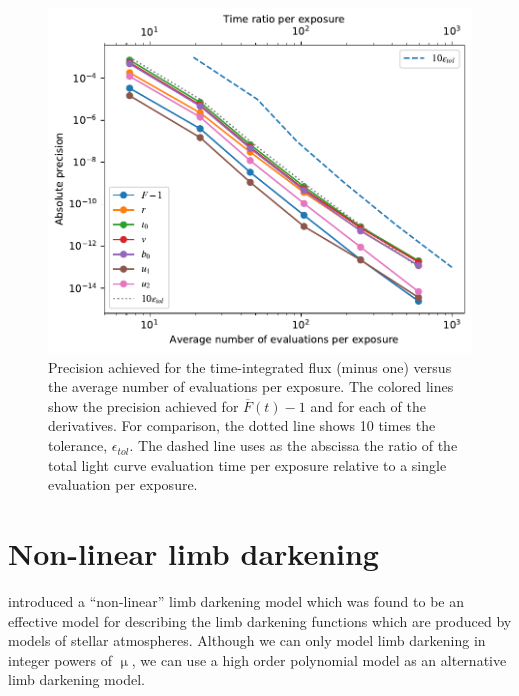 \documentclass[modern,trackchanges]{aastex63}
\begin{document}
{\begin{figure}
    \begin{centering}
    \includegraphics[width=\linewidth]{figures/julia/compare_precision.pdf}
    \caption{Precision achieved for the time-integrated flux (minus one)
    versus the average number of evaluations per exposure.  The colored lines
    show the precision achieved for $\overline{F}(t)-1$ and for each of the derivatives.
    For comparison, the dotted line shows 10 times the tolerance, $\epsilon_{tol}$.
    The dashed line uses as the abscissa the ratio of the total light curve evaluation 
    time per exposure relative to a single evaluation per exposure. 
    \label{fig:integration_precision}}
    \end{centering}
\end{figure}

} 

\pagebreak %

\section{Non-linear limb darkening}\label{sec:nonlinear}

\citet{Claret2000} introduced a ``non-linear'' limb darkening model which
was found to be an effective model for describing the limb darkening functions
which are produced by models of stellar atmospheres.
Although we can only model limb darkening in integer powers of $\upmu$,
we can use a high order polynomial model as an alternative limb darkening model.
\end{document}
